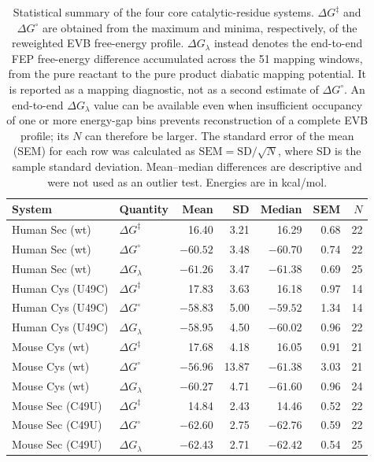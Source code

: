 \documentclass[journal=jpcbfk,manuscript=suppinfo]{achemso}
\begin{document}
\begin{table}[htbp]
\centering
\scriptsize
\caption[Statistical summary of the core EVB systems]{Statistical summary of the four core catalytic-residue systems. {\normalfont $\Delta G^{\ddagger}$ and $\Delta G^{\circ}$ are obtained from the maximum and minima, respectively, of the reweighted EVB free-energy profile. $\Delta G_{\lambda}$ instead denotes the end-to-end FEP free-energy difference accumulated across the 51 mapping windows, from the pure reactant to the pure product diabatic mapping potential. It is reported as a mapping diagnostic, not as a second estimate of $\Delta G^{\circ}$. An end-to-end $\Delta G_{\lambda}$ value can be available even when insufficient occupancy of one or more energy-gap bins prevents reconstruction of a complete EVB profile; its $N$ can therefore be larger. The standard error of the mean (SEM) for each row was calculated as $\mathrm{SEM}=\mathrm{SD}/\sqrt{N}$, where SD is the sample standard deviation. Mean--median differences are descriptive and were not used as an outlier test. Energies are in kcal/mol.}}
\label{tab:evb_stats}
\setlength{\tabcolsep}{3.2pt}
\begin{tabular}{llrrrrr}
\toprule
System & Quantity & Mean & SD & Median & SEM & $N$ \\
\midrule
Human Sec (wt) & $\Delta G^{\ddagger}$ & 16.40 & 3.21 & 16.29 & 0.68 & 22 \\
Human Sec (wt) & $\Delta G^{\circ}$ & $-60.52$ & 3.48 & $-60.70$ & 0.74 & 22 \\
Human Sec (wt) & $\Delta G_{\lambda}$ & $-61.26$ & 3.47 & $-61.38$ & 0.69 & 25 \\
\addlinespace
Human Cys (U49C) & $\Delta G^{\ddagger}$ & 17.83 & 3.63 & 16.18 & 0.97 & 14 \\
Human Cys (U49C) & $\Delta G^{\circ}$ & $-58.83$ & 5.00 & $-59.52$ & 1.34 & 14 \\
Human Cys (U49C) & $\Delta G_{\lambda}$ & $-58.95$ & 4.50 & $-60.02$ & 0.96 & 22 \\
\addlinespace
Mouse Cys (wt) & $\Delta G^{\ddagger}$ & 17.68 & 4.18 & 16.05 & 0.91 & 21 \\
Mouse Cys (wt) & $\Delta G^{\circ}$ & $-56.96$ & 13.87 & $-61.38$ & 3.03 & 21 \\
Mouse Cys (wt) & $\Delta G_{\lambda}$ & $-60.27$ & 4.71 & $-61.60$ & 0.96 & 24 \\
\addlinespace
Mouse Sec (C49U) & $\Delta G^{\ddagger}$ & 14.84 & 2.43 & 14.46 & 0.52 & 22 \\
Mouse Sec (C49U) & $\Delta G^{\circ}$ & $-62.60$ & 2.75 & $-62.76$ & 0.59 & 22 \\
Mouse Sec (C49U) & $\Delta G_{\lambda}$ & $-62.43$ & 2.71 & $-62.42$ & 0.54 & 25 \\
\bottomrule
\end{tabular}
\end{table}
\end{document}
